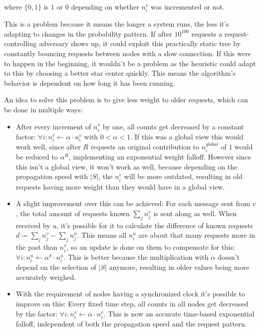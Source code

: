 \documentclass[a4paper, oneside]{discothesis}
\begin{document}
where $\{0,1\}$ is $1$ or $0$ depending on whether $n_i^v$ was incremented or not.

This is a problem because it means the longer a system runs, the less it's adapting to changes in the probability pattern. If after $10^{100}$ requests a request-controlling adversary shows up, it could exploit this practically static tree by constantly bouncing requests between nodes with a slow connection. If this were to happen in the beginning, it wouldn't be a problem as the heuristic could adapt to this by choosing a better star center quickly. This means the algorithm's behavior is dependent on how long it has been running.

An idea to solve this problem is to give less weight to older requests, which can be done in multiple ways:
\begin{itemize}
\item After every increment of $n_i^v$ by one, all counts get decreased by a constant factor: $\forall i:n_i^v\gets \alpha\cdot n_i^v$ with $0<\alpha<1$. If this was a global view this would work well, since after $R$ requests an original contribution to $n_i^{global}$ of $1$ would be reduced to $\alpha^R$, implementing an exponential weight falloff. However since this isn't a global view, it won't work as well, because depending on the propagation speed with $|S|$, the $n_i^v$ will be more outdated, resulting in old requests having more weight than they would have in a global view.
\item A slight improvement over this can be achieved: For each message sent from $v$, the total amount of requests known $\sum_jn_j^v$ is sent along as well. When received by $u$, it's possible for it to calculate the difference of known requests $d\coloneqq\sum_jn_j^v-\sum_jn_j^u$. This means all $n_i^u$ are about that many requests more in the past than $n_i^v$, so an update is done on them to compensate for this: $\forall i:n_i^u\gets\alpha^d\cdot n_i^u$. This is better because the multiplication with $\alpha$ doesn't depend on the selection of $|S|$ anymore, resulting in older values being more accurately weighed.
\item With the requirement of nodes having a synchronized clock it's possible to improve on this: Every fixed time step, all counts in all nodes get decreased by the factor: $\forall i:n_i^v\gets \alpha\cdot n_i^v$. This is now an accurate time-based exponential falloff, independent of both the propagation speed and the request pattern.
\end{itemize}
\end{document}
